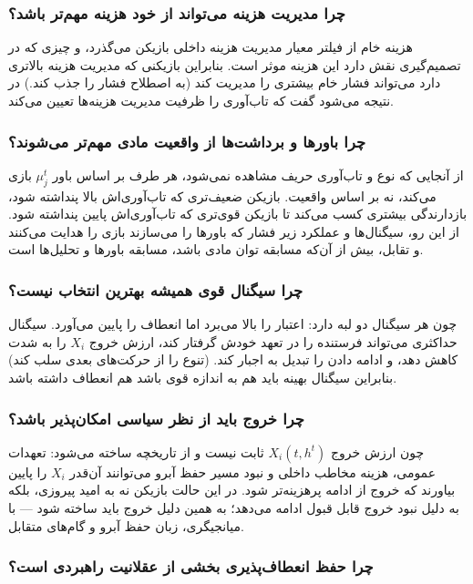 \documentclass[12pt]{article}
\begin{document}
\subsubsection*{چرا مدیریت هزینه می‌تواند از خود هزینه مهم‌تر باشد؟}
هزینه خام از فیلتر معیار مدیریت هزینه داخلی بازیکن می‌گذرد، و چیزی که 
در تصمیم‌گیری نقش دارد این هزینه موثر است. بنابراین بازیکنی
که مدیریت هزینه بالاتری دارد می‌تواند فشار خام بیشتری را مدیریت کند
(به اصطلاح فشار را جذب کند.)
در نتیجه می‌شود گفت که تاب‌آوری را ظرفیت مدیریت هزینه‌ها تعیین می‌کند.

\subsubsection*{چرا باورها و برداشت‌ها از واقعیت مادی مهم‌تر می‌شوند؟}

از آنجایی که نوع و تاب‌آوری حریف مشاهده نمی‌شود،
هر طرف بر اساس باور $\mu_j^t$
 بازی می‌کند، نه بر اساس واقعیت.
بازیکن ضعیف‌تری که تاب‌آوری‌اش بالا پنداشته شود، بازدارندگی بیشتری کسب می‌کند
تا بازیکن قوی‌تری که تاب‌آوری‌اش پایین پنداشته شود.
از این رو، سیگنال‌ها و عملکرد زیر فشار که باورها را می‌سازند بازی را هدایت می‌کنند
و تقابل، بیش از آن‌که مسابقه توان مادی باشد، مسابقه باورها و تحلیل‌ها است.

\subsubsection*{چرا سیگنال قوی همیشه بهترین انتخاب نیست؟}

چون هر سیگنال دو لبه دارد: اعتبار را بالا می‌برد اما انعطاف را پایین می‌آورد.
سیگنال حداکثری می‌تواند فرستنده را در تعهد خودش گرفتار کند،
ارزش خروج $X_i$ 
را به شدت کاهش دهد، و ادامه دادن را تبدیل به اجبار کند. 
(تنوع را از حرکت‌های بعدی سلب کند)
بنابراین سیگنال بهینه باید هم به اندازه قوی باشد هم انعطاف داشته باشد.

\subsubsection*{چرا خروج باید از نظر سیاسی امکان‌پذیر باشد؟}

چون ارزش خروج $X_i(t,h^t)$ ثابت نیست و از تاریخچه ساخته می‌شود:
تعهدات عمومی، هزینه مخاطب داخلی و نبود مسیر حفظ آبرو
می‌توانند آن‌قدر $X_i$ را پایین بیاورند که خروج از ادامه پرهزینه‌تر شود.
در این حالت بازیکن نه به امید پیروزی، بلکه به دلیل نبود خروج قابل قبول ادامه می‌دهد؛
به همین دلیل خروج باید ساخته شود — با میانجیگری، زبان حفظ آبرو و گام‌های متقابل.

\subsubsection*{چرا حفظ انعطاف‌پذیری بخشی از عقلانیت راهبردی است؟}
\end{document}
